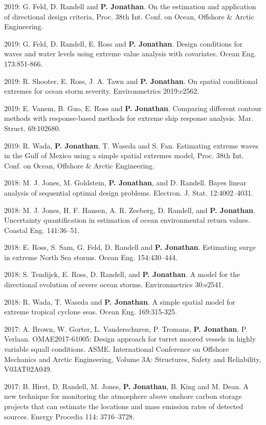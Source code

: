 \documentclass[11pt,a4paper]{moderncv}
\begin{document}
2019: G. Feld, D. Randell and \textbf{P. Jonathan}. On the estimation and application of directional design criteria, Proc. 38th Int. Conf. on Ocean, Offshore \& Arctic Engineering. 

2019: G. Feld, D. Randell, E. Ross and \textbf{P. Jonathan}. Design conditions for waves and water levels using extreme value analysis with covariates. Ocean Eng. 173:851-866.

2019: R. Shooter, E. Ross, J. A. Tawn and \textbf{P. Jonathan}. On spatial conditional extremes for ocean storm severity. Environmetrics 2019:e2562.

2019: E. Vanem, B. Guo, E. Ross and \textbf{P. Jonathan}. Comparing different contour methods with response-based methods for extreme ship response analysis. Mar. Struct. 69:102680.

2019: R. Wada, \textbf{P. Jonathan}, T. Waseda and S. Fan. Estimating extreme waves in the Gulf of Mexico using a simple spatial extremes model, Proc. 38th Int. Conf. on Ocean, Offshore \& Arctic Engineering.

2018: M. J. Jones, M. Goldstein, \textbf{P. Jonathan}, and D. Randell. Bayes linear analysis of sequential optimal design problems. Electron. J. Stat. 12:4002--4031.

2018: M. J. Jones, H. F. Hansen, A. R. Zeeberg, D. Randell, and \textbf{P. Jonathan}. Uncertainty quantification in estimation of ocean environmental return values. Coastal Eng. 141:36--51.

2018: E. Ross, S. Sam, G. Feld, D. Randell and \textbf{P. Jonathan}. Estimating surge in extreme North Sea storms. Ocean Eng. 154:430--444.

2018: S. Tendijck, E. Ross, D. Randell, and \textbf{P. Jonathan}. A model for the directional evolution of severe ocean storms. Environmetrics 30:e2541.

2018: R. Wada, T. Waseda and \textbf{P. Jonathan}. A simple spatial model for extreme tropical cyclone seas.  Ocean Eng. 169:315-325.

2017: A. Brown, W. Gorter, L. Vanderschuren, P. Tromans, \textbf{P. Jonathan}, P. Verlaan. OMAE2017-61005: Design approach for turret moored vessels in highly variable squall conditions. ASME. International Conference on Offshore Mechanics and Arctic Engineering, Volume 3A: Structures, Safety and Reliability, V03AT02A049.

2017: B. Hirst, D. Randell, M. Jones, \textbf{P. Jonathan}, B. King and M. Dean. A new technique for monitoring the atmosphere above onshore carbon storage projects that can estimate the locations and mass emission rates of detected sources.  Energy Procedia 114: 3716--3728.
\end{document}
